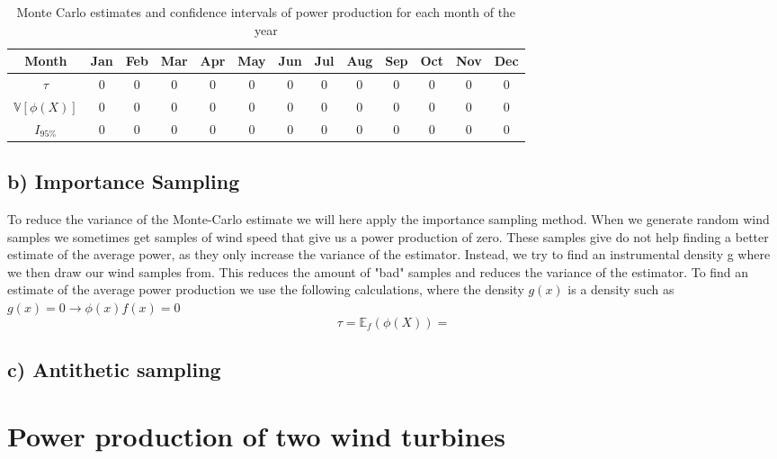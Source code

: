 \documentclass[a4paper]{article}
\begin{document}
\begin{center}
    \begin{table}
        \caption{Monte Carlo estimates and confidence intervals of power production for each month of the year}
        \label{MCresults}
        \begin{tabular}{|c|| c c c c c c c c c c c c ||}
            \hline
            Month & Jan & Feb & Mar & Apr & May & Jun & Jul & Aug & Sep & Oct & Nov & Dec \\
            \hline\hline
            $\tau$ & 0 & 0 & 0 & 0 & 0 & 0 & 0 & 0 & 0 & 0 & 0 & 0 \\
            \hline
            $\mathbb{V}[\phi(X)]$ & 0 & 0 & 0 & 0 & 0 & 0 & 0 & 0 & 0 & 0 & 0 & 0\\
            \hline
            $I_{95\%}$ & 0 & 0 & 0 & 0 & 0 & 0 & 0 & 0 & 0 & 0 & 0 & 0\\
            \hline

        \end{tabular}
    \end{table}
\end{center}

\subsection*{b) Importance Sampling}
To reduce the variance of the Monte-Carlo estimate we will here apply the importance sampling method. When we generate random wind samples we sometimes get samples of wind speed that give us a power production of zero. These samples give do not help finding a better estimate of the average power, as they only increase the variance of the estimator. Instead, we try to find an instrumental density g where we then draw our wind samples from. This reduces the amount of "bad" samples and reduces the variance of the estimator. \noindent To find an estimate of the average power production we use the following calculations, where the density $g(x)$ is a density such as $g(x) = 0 \rightarrow \phi(x)f(x) = 0$
\begin{equation}
    \tau = \mathbb{E}_f(\phi(X)) = 
\end{equation}

\subsection*{c) Antithetic sampling}


\section*{Power production of two wind turbines}
\end{document}
